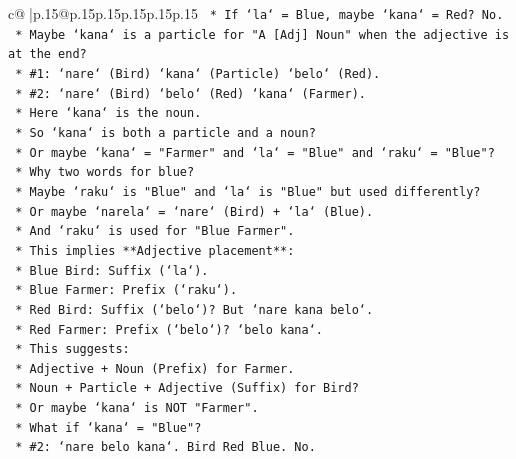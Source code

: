 \documentclass{article}
\begin{document}
{\begin{supertabular}{c@{$\;$}|p{.15\linewidth}@{}p{.15\linewidth}p{.15\linewidth}p{.15\linewidth}p{.15\linewidth}p{.15\linewidth}}
{{{\texttt{                *   If `la` = Blue, maybe `kana` = Red? No.} \\
\texttt{                *   Maybe `kana` is a particle for "A {[}Adj{]} Noun" when the adjective is at the end?} \\
\texttt{                *   \#1: `nare` (Bird) `kana` (Particle) `belo` (Red).} \\
\texttt{                *   \#2: `nare` (Bird) `belo` (Red) `kana` (Farmer).} \\
\texttt{                    *   Here `kana` is the noun.} \\
\texttt{                    *   So `kana` is both a particle and a noun?} \\
\texttt{                    *   Or maybe `kana` = "Farmer" and `la` = "Blue" and `raku` = "Blue"?} \\
\texttt{                    *   Why two words for blue?} \\
\texttt{                    *   Maybe `raku` is "Blue" and `la` is "Blue" but used differently?} \\
\texttt{                    *   Or maybe `narela` = `nare` (Bird) + `la` (Blue).} \\
\texttt{                    *   And `raku` is used for "Blue Farmer".} \\
\texttt{                    *   This implies **Adjective placement**:} \\
\texttt{                        *   Blue Bird: Suffix (`la`).} \\
\texttt{                        *   Blue Farmer: Prefix (`raku`).} \\
\texttt{                        *   Red Bird: Suffix (`belo`)? But `nare kana belo`.} \\
\texttt{                        *   Red Farmer: Prefix (`belo`)? `belo kana`.} \\
\texttt{                    *   This suggests:} \\
\texttt{                        *   Adjective + Noun (Prefix) for Farmer.} \\
\texttt{                        *   Noun + Particle + Adjective (Suffix) for Bird?} \\
\texttt{                        *   Or maybe `kana` is NOT "Farmer".} \\
\texttt{                        *   What if `kana` = "Blue"?} \\
\texttt{                            *   \#2: `nare belo kana`. Bird Red Blue. No.} \\
}}}
\end{supertabular}}
\end{document}
